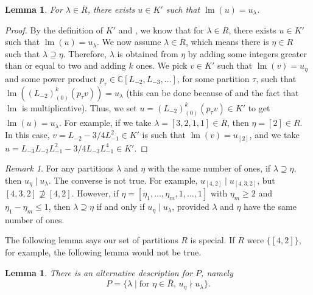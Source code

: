 \documentclass[a4paper, 12pt, reqno]{amsart}
\newtheorem{lemma}[theorem]{Lemma}
\theoremstyle{remark}
\newtheorem{remark}[theorem]{Remark}
\DeclareMathOperator{\lm}{lm}
\begin{document}
\begin{lemma}
  \label{lmm:37}
  For $\lambda \in \overline{R}$, there exists $u \in K'$ such that $\lm(u) = u_{\lambda}$.
\end{lemma}

\begin{proof}
  By the definition of $K'$ and \cite[Proposition 5.1]{andrews_singular_2022}, we know that for $\lambda \in R$, there exists $u \in K'$ such that $\lm(u) = u_{\lambda}$.
  We now assume $\lambda \in \overline{R}$, which means there is $\eta \in R$ such that $\lambda \supseteq \eta$.
  Therefore, $\lambda$ is obtained from $\eta$ by adding some integers greater than or equal to two and adding $k$ ones.
  We pick $v \in K'$ such that $\lm(v) = u_{\eta}$ and some power product $p_{\tau} \in \mathbb{C}[L_{-2}, L_{-3}, \dots]$, for some partition $\tau$, such that $\lm((L_{-2})^k_{(0)}(p_{\tau}v)) = u_{\lambda}$ (this can be done because of  and the fact that $\lm$ is multiplicative).
  Thus, we set $u = (L_{-2})^k_{(0)}(p_{\tau}v) \in K'$ to get $\lm(u) = u_{\lambda}$.
  For example, if we take $\lambda = [3, 2, 1, 1] \in \overline{R}$, then $\eta = [2] \in R$.
  In this case, $v = L_{-2}- 3/4L_{-1}^2 \in K'$ is such that $\lm(v) = u_{[2]}$, and we take $u = L_{-3}L_{-2}L_{-1}^2 - 3/4L_{-3}L_{-1}^4 \in K'$.
\end{proof}

\begin{remark}
  \label{rmk:51}
  For any partitions $\lambda$ and $\eta$ with the same number of ones, if $\lambda \supseteq \eta$, then $u_{\eta} \mid u_{\lambda}$.
  The converse is not true.
  For example, $u_{[4, 2]} \mid u_{[4, 3, 2]}$, but $[4, 3, 2] \nsupseteq [4, 2]$.
  However, if $\eta = [\eta_1, \dots, \eta_m, 1, \dots, 1]$ with $\eta_m \ge 2$ and $\eta_1 - \eta_m \le 1$, then $\lambda \supseteq \eta$ if and only if $u_{\eta} \mid u_{\lambda}$, provided $\lambda$ and $\eta$ have the same number of ones.
\end{remark}

The following lemma says our set of partitions $R$ is special.
If $R$ were $\{[4, 2]\}$, for example, the following lemma would not be true.

\begin{lemma}
  \label{lmm:38}
  There is an alternative description for $P$, namely
  \begin{equation*}
    P = \{\lambda \mid \text{for $\eta \in \overline{R}$, $u_{\eta} \nmid u_{\lambda}$}\}.
  \end{equation*}
\end{lemma}
\end{document}
